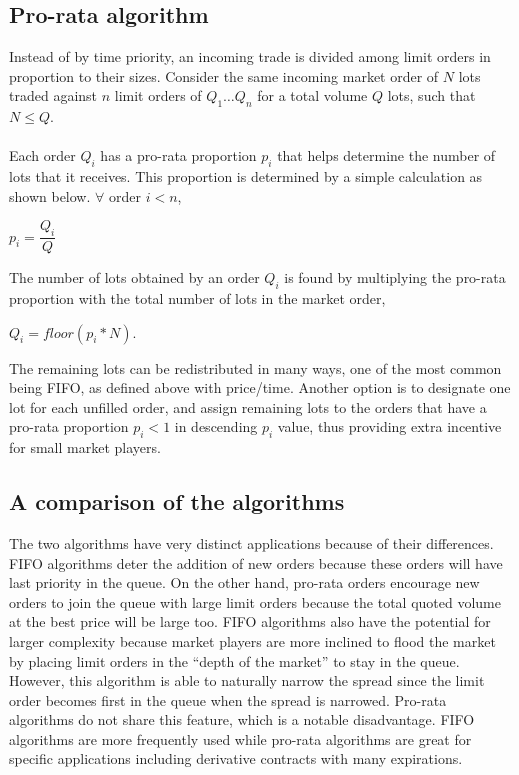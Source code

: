 \documentclass{article}
\begin{document}
\subsection{Pro-rata algorithm}
Instead of by time priority, an  incoming trade is divided among limit orders in proportion to their sizes. Consider the same incoming market order of $N$ lots traded against $n$ limit orders of $Q_1\ldots Q_n$ for a total volume $Q$ lots, such that $N \leq Q$.\\\\
Each order $Q_i$ has a pro-rata proportion $p_i $ that helps determine the number of lots that it receives. This proportion is determined by a simple calculation as shown below. $\forall$ order $i < n$, 
\begin{center}
    $p_i = \dfrac{Q_i}{Q}$
\end{center}
The number of lots obtained by an order $Q_i$ is found by multiplying the pro-rata proportion with the total number of lots in the market order, 
\begin{center}
    $Q_i = floor(p_i * N)$.
\end{center}
 The remaining lots can be redistributed in many ways, one of the most common being FIFO, as defined above with price/time. Another option is to designate one lot for each unfilled order, and assign remaining lots to the orders that have a pro-rata proportion $p_i < 1$ in descending $p_i$ value, thus providing extra incentive for small market players. 

\subsection{A comparison of the algorithms}
The two algorithms have very distinct applications because of their differences. FIFO algorithms deter the addition of new orders because these orders will have last priority in the queue. On the other hand, pro-rata orders encourage new orders to join the queue with large limit orders because the total quoted volume at the best price will be large too. FIFO algorithms also have the potential for larger complexity because market players are more inclined to flood the market by placing limit orders in the “depth of the market” to stay in the queue. However, this algorithm is able to naturally narrow the spread since the limit order becomes first in the queue when the spread is narrowed. Pro-rata algorithms do not share this feature, which is a notable disadvantage. FIFO algorithms are more frequently used while pro-rata algorithms are great for specific applications including derivative contracts with many expirations. 
\end{document}
